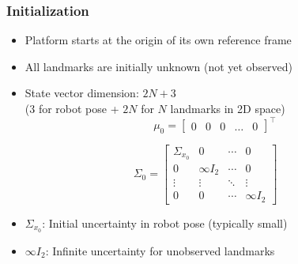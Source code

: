 \begin{frame}
    \frametitle{Initialization}

    \begin{itemize}
        \item Platform starts at the origin of its own reference frame
        \item All landmarks are initially unknown (not yet observed)
        \item State vector dimension: $2N + 3$ \\
        (3 for robot pose + $2N$ for $N$ landmarks in 2D space)
        \begin{equation*}
            \mu_0 =
            \begin{bmatrix}
                0 & 0 & 0 & \dots & 0    
            \end{bmatrix}^{\top}
        \end{equation*}
    \end{itemize}
    
    \begin{equation*}
        \Sigma_0 =
        \begin{bmatrix}
            \Sigma_{x_0} & 0 & \cdots & 0 \\
            0 & \infty I_{2} & \cdots & 0 \\
            \vdots & \vdots & \ddots & \vdots \\
            0 & 0 & \cdots & \infty I_{2}
        \end{bmatrix}
    \end{equation*}
    
    \begin{itemize}
        \item $\Sigma_{x_0}$: Initial uncertainty in robot pose (typically small)
        \item $\infty I_{2}$: Infinite uncertainty for unobserved landmarks
    \end{itemize}
\end{frame}

